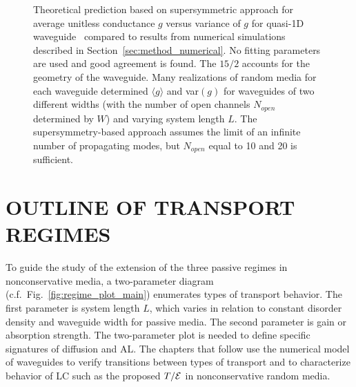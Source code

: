 \begin{figure}[t]
\vskip -0.5cm
\centerline{
}
\vskip -0.5cm
\caption[Theoretical prediction based on supersymmetric approach for average unitless conductance $g$ versus variance of $g$ for quasi-1D waveguide~\cite{2000_Mirlin} compared to results from numerical simulations described in Section~\ref{sec:method_numerical}.]
{Theoretical prediction based on supersymmetric approach for average unitless conductance $g$ versus variance of $g$ for quasi-1D waveguide~\cite{2000_Mirlin} compared to results from numerical simulations described in Section~\ref{sec:method_numerical}. No fitting parameters are used and good agreement is found. The $15/2$ accounts for the geometry of the waveguide. Many realizations of random media for each waveguide determined $\langle g \rangle$ and var$(g)$ for waveguides of two different widths (with the number of open channels $N_{open}$ determined by $W$) and varying system length $L$. The supersymmetry-based approach assumes the limit of an infinite number of propagating modes, but $N_{open}$ equal to 10 and 20 is sufficient.\label{fig:Mirlin_supersymmetry_g_varg}}
\end{figure}
  

\section{OUTLINE OF TRANSPORT REGIMES}
\label{sec:twod_plot}

To guide the study of the extension of the three passive regimes in nonconservative media, a two-parameter diagram (c.f.~Fig.~\ref{fig:regime_plot_main})  %
enumerates types of transport behavior. The first parameter is system length $L$, which varies in relation to constant disorder density and waveguide width for passive media. The second parameter is gain or absorption strength. The two-parameter plot is needed to define specific signatures of diffusion and AL. The chapters that follow use the numerical model of waveguides to verify transitions between types of transport and to characterize behavior of LC such as the proposed $T/{\cal E}$ in nonconservative random media.

